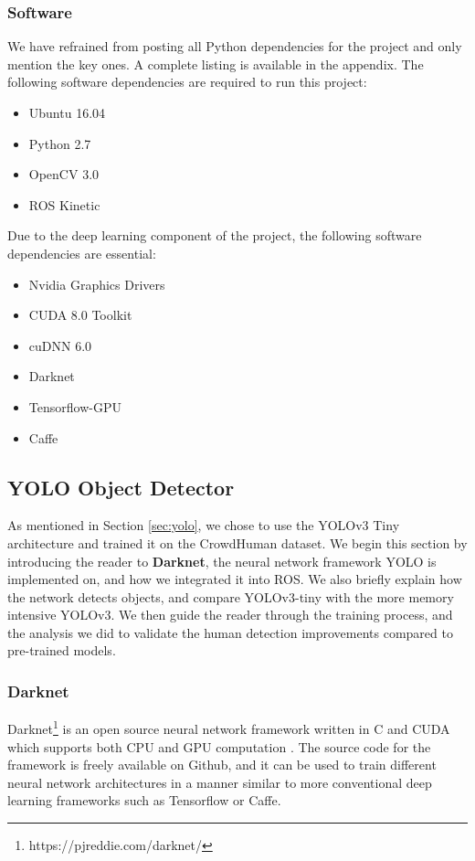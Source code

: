 \subsubsection{Software}
We have refrained from posting all Python dependencies for the project and only mention the key ones. A complete listing is available in the appendix. The following software dependencies are required to run this project:
\begin{itemize}
	\item Ubuntu 16.04
	\item Python 2.7
	\item OpenCV 3.0
	\item ROS Kinetic
\end{itemize}

Due to the deep learning component of the project, the following software dependencies are essential:
\begin{itemize}
	\item Nvidia Graphics Drivers 
	\item CUDA 8.0 Toolkit
	\item cuDNN 6.0
	\item Darknet
	\item Tensorflow-GPU
	\item Caffe
\end{itemize}

\subsection{YOLO Object Detector}
As mentioned in Section \ref{sec:yolo}, we chose to use the YOLOv3 Tiny architecture and trained it on the CrowdHuman dataset. We begin this section by introducing the reader to \textbf{Darknet}, the neural network framework YOLO is implemented on, and how we integrated it into ROS. We also briefly explain how the network detects objects, and compare YOLOv3-tiny with the more memory intensive YOLOv3. We then guide the reader through the training process, and the analysis we did to validate the human detection improvements compared to pre-trained models.

\subsubsection{Darknet}
Darknet\footnote{https://pjreddie.com/darknet/} is an open source neural network framework written in C and CUDA which supports both CPU and GPU computation \cite{darknet13}. The source code for the framework is freely available on Github, and it can be used to train different neural network architectures in a manner similar to more conventional deep learning frameworks such as Tensorflow or Caffe.

